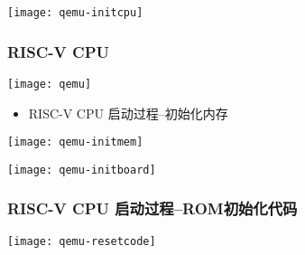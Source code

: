 \begin{frame}[plain]
%		
%		
	\centering
	\texttt{[image: qemu-initcpu]}
\end{frame}

\begin{frame}
	\frametitle{RISC-V CPU}
	\texttt{[image: qemu]}	
	\begin{itemize}
		
		\item RISC-V CPU 启动过程--初始化内存
		
	\end{itemize}	
	
	\centering
	\texttt{[image: qemu-initmem]}
\end{frame}

\begin{frame}[plain]
%		
%		
	\centering
	\texttt{[image: qemu-initboard]}
\end{frame}


\begin{frame}[plain]
	\frametitle{RISC-V CPU 启动过程--ROM初始化代码}
%		
%		
	
	\centering
	\texttt{[image: qemu-resetcode]}
\end{frame}




